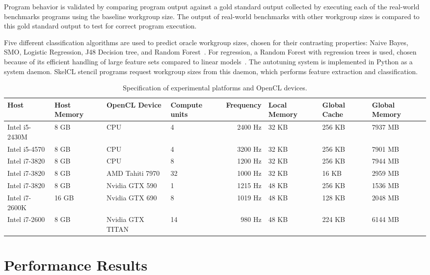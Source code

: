   Program behavior is validated by comparing program output against a
  gold standard output collected by executing each of the real-world
  benchmarks programs using the baseline workgroup size. The output of
  real-world benchmarks with other workgroup sizes is compared to this
  gold standard output to test for correct program execution.

  Five different classification algorithms are used to predict oracle
  workgroup sizes, chosen for their contrasting properties: Naive Bayes,
  SMO, Logistic Regression, J48 Decision tree, and Random
  Forest~\cite{Han2011}. For regression, a Random Forest with regression
  trees is used, chosen because of its efficient handling of large
  feature sets compared to linear models~\cite{Breiman1999}. The
  autotuning system is implemented in Python as a system daemon. SkelCL
  stencil programs request workgroup sizes from this daemon, which
  performs feature extraction and classification.

  \begin{table}
    \tiny
    \centering
    \begin{tabular}{l R{1.1cm} | l R{1.1cm} r R{1.2cm} R{1.2cm} R{1.2cm}}
      \toprule
      Host & Host Memory & OpenCL Device & Compute units & Frequency & Local Memory & Global Cache & Global Memory \\
      \midrule
      Intel i5-2430M & 8 GB & CPU & 4 & 2400 Hz & 32 KB & 256 KB & 7937 MB \\
      Intel i5-4570 & 8 GB & CPU & 4 & 3200 Hz & 32 KB & 256 KB & 7901 MB \\
      Intel i7-3820 & 8 GB & CPU & 8 & 1200 Hz & 32 KB & 256 KB & 7944 MB \\
      Intel i7-3820 & 8 GB & AMD Tahiti 7970 & 32 & 1000 Hz & 32 KB & 16 KB & 2959 MB \\
      Intel i7-3820 & 8 GB & Nvidia GTX 590 & 1 & 1215 Hz & 48 KB & 256 KB & 1536 MB \\
      Intel i7-2600K & 16 GB & Nvidia GTX 690 & 8 & 1019 Hz & 48 KB & 128 KB & 2048 MB \\
      Intel i7-2600 & 8 GB & Nvidia GTX TITAN & 14 & 980 Hz & 48 KB & 224 KB & 6144 MB \\
      \bottomrule
    \end{tabular}
    \caption{Specification of experimental platforms and OpenCL devices.}
    \label{tab:hw}
  \end{table}


  \section{Performance Results}\label{sec:evaluation}

